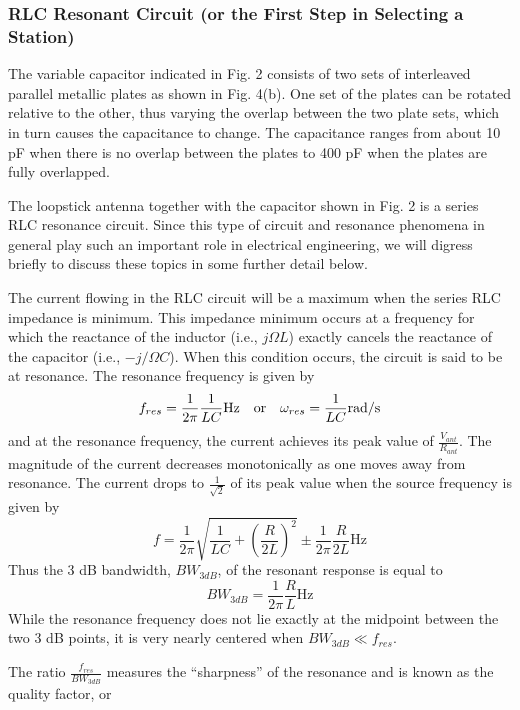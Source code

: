 \documentclass[12pt]{article}
\begin{document}
\subsubsection{RLC Resonant Circuit (or the First Step in Selecting a Station)}
The variable capacitor indicated in Fig. 2 consists of two sets of interleaved parallel metallic plates as
shown in Fig. 4(b). One set of the plates can be rotated relative to the other, thus varying the overlap
between the two plate sets, which in turn causes the capacitance to change. The capacitance ranges from
about 10 pF when there is no overlap between the plates to 400 pF when the plates are fully overlapped.
\par The loopstick antenna together with the capacitor shown in Fig. 2 is a series RLC resonance circuit.
Since this type of circuit and resonance phenomena in general play such an important role in electrical
engineering, we will digress briefly to discuss these topics in some further detail below.
\par The current flowing in the RLC circuit will be a maximum when the series RLC impedance is minimum.
This impedance minimum occurs at a frequency for which the reactance of the inductor (i.e., $j\Omega L$) exactly
cancels the reactance of the capacitor (i.e., $−j/\Omega C$). When this condition occurs, the circuit is said to be at
resonance. The resonance frequency is given by
\begin{equation}
f_{res}=\frac{1}{2\pi}\frac{1}{LC}\text{Hz\quad or\quad}\omega_{res}=\frac{1}{LC}\text{rad/s} 
\end{equation}
and at the resonance frequency, the current achieves its peak value of $\frac{V_{ant}}{R_{ant}}$. The magnitude of the
current decreases monotonically as one moves away from resonance. The current drops to $\frac{1}{\sqrt{2}}$ of its peak
value when the source frequency is given by
\begin{equation}
f=\frac{1}{2\pi}\sqrt{\frac{1}{LC}+(\frac{R}{2L})^2}\pm\frac{1}{2\pi}\frac{R}{2L}\text{Hz}
\end{equation}
Thus the 3 dB bandwidth, $BW_{3dB}$, of the resonant response is equal to
\begin{equation}
BW_{3dB}=\frac{1}{2\pi}\frac{R}{L}\text{Hz}
\end{equation}
While the resonance frequency does not lie exactly at the midpoint between the two 3 dB points, it is very
nearly centered when $BW_{3dB}\ll f_{res}$.
\par The ratio $\frac{f_{res}}{BW_{3dB}}$ measures the “sharpness” of the resonance and is known as the quality factor, or
\end{document}
